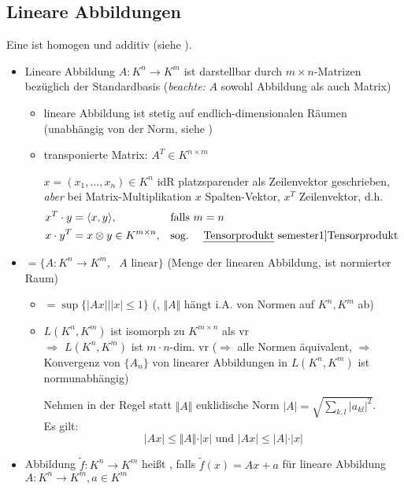 \subsection{Lineare Abbildungen}
Eine  ist homogen und additiv (siehe ).
\begin{itemize}
	\item Lineare Abbildung $A: K^n \rightarrow K^m$ ist darstellbar durch $m\times n$-Matrizen bezüglich der Standardbasis 
	(\emph{beachte:} $A$ sowohl Abbildung als auch Matrix)
	\begin{itemize}
		\item lineare Abbildung ist stetig auf endlich-dimensionalen Räumen (unabhängig von der Norm, siehe )
		\item transponierte Matrix: $A^T\in K^{n\times m}$
		
		\begin{hint}
		$x=(x_1,\dotsc, x_n)\in K^n$ idR platzsparender als Zeilenvektor geschrieben, \emph{aber} bei Matrix-Multiplikation $x$ Spalten-Vektor, $x^T$ Zeilenvektor, d.h.	\begin{align*}
		 x^T \cdot y &= \langle x,y\rangle, &&\text{falls $m=n$} \\
		 x \cdot y^T &= x \otimes y\in K^{m\times n}, && \text{sog. \begriff{Tensorprodukt}}
		 \end{align*}
		\end{hint}
	\end{itemize}	
	 \item {}$ = \{ A: K^n \to K^m, \text{ $A$ linear}\}$ (Menge der linearen Abbildung, ist normierter Raum)
	\begin{itemize}
		 \item {}$= \sup\{ \vert Ax\vert \mid \vert x \vert \le 1 \}$ (, $\Vert A \Vert$ hängt i.A. von Normen auf $K^n, K^m$ ab)
		 \item $L(K^n, K^m)$ ist isomorph zu $K^{m\times n}$ als \gls{vr} \\
		 $\Rightarrow$ $L(K^n, K^m)$ ist $m\cdot n$-dim. \gls{vr} ($\Rightarrow$ alle Normen äquivalent, $\Rightarrow$ Konvergenz von $\{A_n\}$ von linearer Abbildungen in $L(K^n, K^m)$ ist normunabhängig)
		 
		 Nehmen in der Regel statt $\Vert A \Vert$ euklidische Norm $\vert A \vert = \sqrt{\sum\limits_{k,l} \vert a_{kl} \vert ^2}$.\\
		 Es gilt: \[ \vert Ax \vert \le \Vert A \Vert\cdot \vert x \vert \text{ und } \vert Ax\vert \le \vert A \vert \cdot\vert x \vert \]
	\end{itemize}
	\item Abbildung $\tilde{f}: K^n \to K^m$ heißt  , falls $\tilde{f}(x) = Ax + a$ für lineare Abbildung $A:K^n\to K^m, a\in K^m$
\end{itemize}

